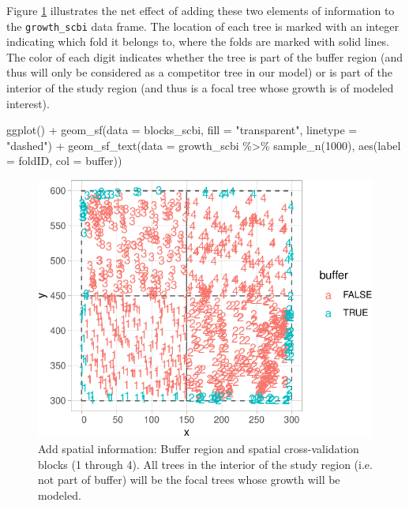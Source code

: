 \documentclass[12pt]{article}
\newenvironment{Shaded}{\begin{snugshade}}{\end{snugshade}}
\newcommand{\AttributeTok}[1]{\textcolor[rgb]{0.77,0.63,0.00}{#1}}
\newcommand{\DecValTok}[1]{\textcolor[rgb]{0.00,0.00,0.81}{#1}}
\newcommand{\FunctionTok}[1]{\textcolor[rgb]{0.00,0.00,0.00}{#1}}
\newcommand{\NormalTok}[1]{#1}
\newcommand{\OtherTok}[1]{\textcolor[rgb]{0.56,0.35,0.01}{#1}}
\newcommand{\SpecialCharTok}[1]{\textcolor[rgb]{0.00,0.00,0.00}{#1}}
\newcommand{\StringTok}[1]{\textcolor[rgb]{0.31,0.60,0.02}{#1}}
\begin{document}
\begin{Shaded}
\end{Shaded}

Figure \ref{fig:scbi-spatial-information} illustrates the net effect of
adding these two elements of information to the \texttt{growth\_scbi}
data frame. The location of each tree is marked with an integer
indicating which fold it belongs to, where the folds are marked with
solid lines. The color of each digit indicates whether the tree is part
of the buffer region (and thus will only be considered as a competitor
tree in our model) or is part of the interior of the study region (and
thus is a focal tree whose growth is of modeled interest).

\begin{Shaded}
\begin{Highlighting}[]
\FunctionTok{ggplot}\NormalTok{() }\SpecialCharTok{+}
  \FunctionTok{geom\_sf}\NormalTok{(}\AttributeTok{data =}\NormalTok{ blocks\_scbi, }\AttributeTok{fill =} \StringTok{"transparent"}\NormalTok{, }\AttributeTok{linetype =} \StringTok{"dashed"}\NormalTok{) }\SpecialCharTok{+}
  \FunctionTok{geom\_sf\_text}\NormalTok{(}\AttributeTok{data =}\NormalTok{ growth\_scbi }\SpecialCharTok{\%\textgreater{}\%} \FunctionTok{sample\_n}\NormalTok{(}\DecValTok{1000}\NormalTok{), }\FunctionTok{aes}\NormalTok{(}\AttributeTok{label =}\NormalTok{ foldID, }\AttributeTok{col =}\NormalTok{ buffer))}
\end{Highlighting}
\end{Shaded}

\begin{figure}

{\centering \includegraphics[width=0.66\linewidth]{Figures/scbi-spatial-information-1} 

}

\caption{Add spatial information: Buffer region and spatial cross-validation blocks (1 through 4). All trees in the interior of the study region (i.e. not part of buffer) will be the focal trees whose growth will be modeled.}\label{fig:scbi-spatial-information}
\end{figure}
\end{document}
